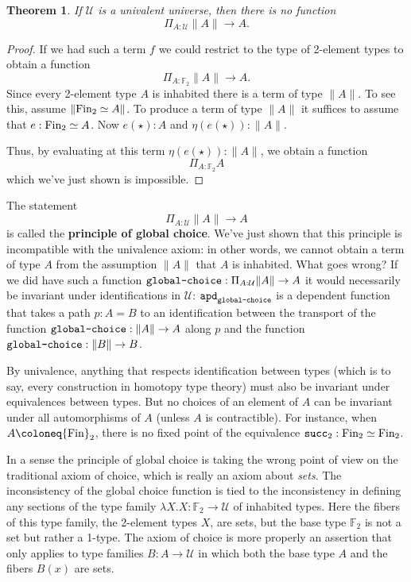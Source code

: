 \documentclass{amsart}
\theoremstyle{theorem}
\newtheorem*{thm}{Theorem}
\theoremstyle{definition}
\theoremstyle{remark}
\newcommand{\0}{\mathbbe{0}}
\newcommand{\1}{\mathbbe{1}}
\newcommand{\2}{\mathbbe{2}}
\newcommand{\3}{\mathbbe{3}}
\newcommand{\4}{\mathbbe{4}}
\newcommand{\FF}{\mathbb{F}}
\newcommand{\term}[1]{{\textup{\texttt{#1}}}}
\newcommand{\type}[1]{{\textup{#1}}}
\newcommand{\apd}{\term{apd}}
\newcommand{\UU}{{\mathcal{U}}}
\newcommand{\mere}[1]{\|{#1}\|}
\newcommand{\Fin}{\type{Fin}}
\begin{document}
\begin{thm} If $\UU$ is a univalent universe, then there is no function
\[ \Pi_{A: \UU} \mere{A} \to A.\]
\end{thm}
\begin{proof}
If we had such a term $f$ we could restrict to the type of 2-element types to obtain a function
\[ \Pi_{A: \FF_2} \mere{A} \to A.\]
Since every 2-element type $A$ is inhabited there is a term of type $\mere{A}$. To see this, assume $\mere{\Fin_2 \simeq A}$. To produce a term of type $\mere{A}$ it suffices to assume that $e: \Fin_2 \simeq A$. Now $e(\star) : A$ and $\eta(e(\star)) : \mere{A}$.

 Thus, by evaluating at this term $\eta(e(\star)) : \mere{A}$, we obtain a function
\[ \Pi_{A: \FF_2} A\]
which we've just shown is impossible.
\end{proof}

The statement 
\[ \Pi_{A: \UU} \mere{A} \to A\]
is called the \textbf{principle of global choice}. We've just shown that this principle is incompatible with the univalence axiom: in other words, we cannot obtain a term of type $A$ from the assumption $\mere{A}$ that $A$ is inhabited. What goes wrong? If we did have such a function $\term{global-choice} : \Pi_{A: \UU} \mere{A} \to A$ it would necessarily be invariant under identifications in $\UU$: $\apd_{\term{global-choice}}$ is a dependent function that takes a path $p : A = B$ to an identification between the transport of the function $\term{global-choice} : \mere{A} \to A$ along $p$ and the function $\term{global-choice} : \mere{B}  \to B$. 

By univalence, anything that respects identification between types (which is to say, every construction in homotopy type theory) must also be invariant under equivalences between types. But no choices of an element of $A$ can be invariant under all automorphisms of $A$ (unless $A$ is contractible). For instance, when $A \coloneq \Fin_2$, there is no fixed point of the equivalence $\term{succ}_2 : \Fin_2 \simeq \Fin_2$.


In a sense the principle of global choice is taking the wrong point of view on the traditional axiom of choice, which is really an axiom about \emph{sets}. The inconsistency of the global choice function is tied to the inconsistency in defining any sections of the type family $\lambda X.X : \FF_2 \to \UU$ of inhabited types. Here the fibers of this type family, the 2-element types $X$, are sets, but the base type $\FF_2$ is not a set but rather a 1-type. The axiom of choice is more properly an assertion that only applies to type families $B \colon A \to \UU$ in which both the base type $A$ and the fibers $B(x)$ are sets.
\end{document}
